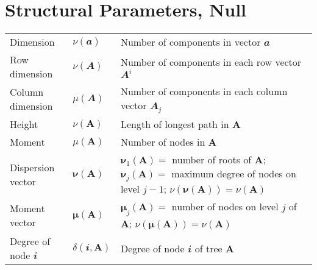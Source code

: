 \section{Structural Parameters, Null}
\begin{tabularx}{\textwidth}{ l l X }
	Dimension                         & \( ν(\mathbfit{a}) \)             & Number of components in vector \( \mathbfit{a} \)                                                                                                                                                    \\
	Row dimension                     & \( ν(\mathbfit{A}) \)             & Number of components in each row vector \( \mathbfit{A}^i \)                                                                                                                                         \\
	Column dimension                  & \( μ(\mathbfit{A}) \)             & Number of components in each column vector \( \mathbfit{A}_j \)                                                                                                                                      \\
	Height                            & \( ν(\mathbf{A}) \)               & Length of longest path in \( \mathbf{A} \)                                                                                                                                                           \\ 
	Moment                            & \( μ(\mathbf{A}) \)               & Number of nodes in \( \mathbf{A} \)                                                                                                                                                                  \\
	Dispersion vector                 & \( \mathbf{ν}(\mathbf{A}) \)      & \( \mathbf{ν}_1(\mathbf{A}) = \) number of roots of \( \mathbf{A} \); \( \mathbf{ν}_j(\mathbf{A}) = \) maximum degree of nodes on level \( j − 1 \); \( ν(\mathbf{ν}(\mathbf{A})) = ν(\mathbf{A}) \) \\ 
	Moment vector                     & \( \mathbf{μ}(\mathbf{A}) \)      & \( \mathbf{μ}_j(\mathbf{A}) = \) number of nodes on level \( j \) of \( \mathbf{A} \); \( ν(\mathbf{μ}(\mathbf{A})) = ν(\mathbf{A}) \)                                                               \\
	Degree of node \( \mathbfit{i} \) & \( δ(\mathbfit{i}, \mathbf{A}) \) & Degree of node \( \mathbfit{i} \) of tree \( \mathbf{A} \)                                                                                                                                           \\

\end{tabularx}
